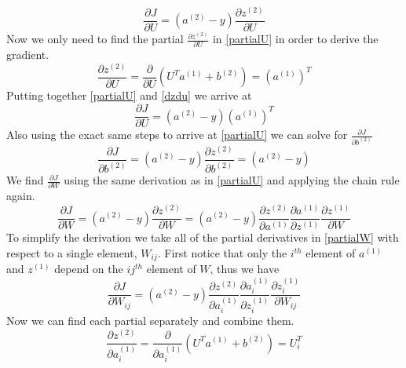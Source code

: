 \documentclass{article}
\begin{document}
\begin{equation}\label{partialU}
\frac{\partial J}{\partial U} = \left(a^{(2)} - y\right)\frac{\partial z^{(2)}}{\partial U}
\end{equation}
Now we only need to find the partial \( \frac{\partial z^{(2)}}{\partial U} \) in \eqref{partialU} in order to derive the gradient.
\begin{equation}\label{dzdu}
\frac{\partial z^{(2)}}{\partial U} = \frac{\partial }{\partial U}\left(U^Ta^{(1)}+b^{(2)}\right) = (a^{(1)})^T
\end{equation}
Putting together \eqref{partialU} and \eqref{dzdu} we arrive at
\begin{equation}\label{djdu}
\frac{\partial J}{\partial U} = \left(a^{(2)} - y\right)(a^{(1)})^T
\end{equation}
Also using the exact same steps to arrive at \eqref{partialU} we can solve for \( \frac{\partial J}{\partial b^{(2)}}\)
\begin{equation}\label{djdb2}
\frac{\partial J}{\partial b^{(2)}} = \left(a^{(2)} - y\right)\frac{\partial z^{(2)}}{\partial b^{(2)}}  = \left(a^{(2)} - y\right)
\end{equation}
We find \( \frac{\partial J}{\partial W}\) using the same derivation as in \eqref{partialU} and applying the chain rule again.
\begin{equation}\label{partialW}
\frac{\partial J}{\partial W} = \left(a^{(2)} - y\right)\frac{\partial z^{(2)}}{\partial W} = \left(a^{(2)} - y\right)\frac{\partial z^{(2)}}{\partial a^{(1)}}\frac{\partial a^{(1)}}{\partial z^{(1)}}\frac{\partial z^{(1)}}{\partial W}
\end{equation}
To simplify the derivation we take all of the partial derivatives in \eqref{partialW} with respect to a single element, \(W_{ij}\).  First notice that only the \(i^{th}\) element of \(a^{(1)}\) and \(z^{(1)}\) depend on the \(ij^{th}\) element of \(W\), thus we have
\begin{equation}\label{dJdW}
\frac{\partial J}{\partial W_{ij}} = \left(a^{(2)} - y\right)\frac{\partial z^{(2)}}{\partial a_{i}^{(1)}}\frac{\partial a_{i}^{(1)}}{\partial z_{i}^{(1)}}\frac{\partial z_{i}^{(1)}}{\partial W_{ij}}
\end{equation}
Now we can find each partial separately and combine them.
\begin{equation}\label{dz2da1}
\frac{\partial z^{(2)}}{\partial a_{i}^{(1)}} = \frac{\partial}{\partial a_{i}^{(1)}}\left(U^Ta^{(1)}+b^{(2)}\right) = U^T_{i}
\end{equation}
\end{document}
